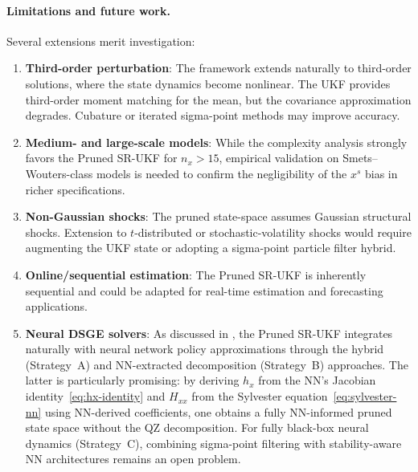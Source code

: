 \documentclass[12pt,a4paper]{article}
\newcommand{\xs}{{x^{s}}}
\newcommand{\hx}{h_x}
\newcommand{\Hxx}{H_{xx}}
\begin{document}
\paragraph{Limitations and future work.}
Several extensions merit investigation:
\begin{enumerate}[nosep]
\item \textbf{Third-order perturbation}: The framework extends
naturally to third-order solutions, where the state dynamics become
nonlinear. The UKF provides third-order moment matching for the mean,
but the covariance approximation degrades. Cubature or iterated
sigma-point methods may improve accuracy.
\item \textbf{Medium- and large-scale models}: While the complexity
analysis strongly favors the Pruned SR-UKF for $n_x > 15$, empirical
validation on Smets--Wouters-class models is needed to confirm the
negligibility of the $\xs$ bias in richer specifications.
\item \textbf{Non-Gaussian shocks}: The pruned state-space assumes
Gaussian structural shocks. Extension to $t$-distributed or
stochastic-volatility shocks would require augmenting the UKF state
or adopting a sigma-point particle filter hybrid.
\item \textbf{Online/sequential estimation}: The Pruned SR-UKF is
inherently sequential and could be adapted for real-time estimation
and forecasting applications.
\item \textbf{Neural DSGE solvers}: As discussed in
, the Pruned SR-UKF integrates naturally with
neural network policy approximations through the hybrid
(Strategy~A) and NN-extracted decomposition (Strategy~B) approaches.
The latter is particularly promising: by deriving $\hx$ from the
NN's Jacobian identity~\eqref{eq:hx-identity} and $\Hxx$ from the
Sylvester equation~\eqref{eq:sylvester-nn} using NN-derived
coefficients, one obtains a fully NN-informed pruned state space
without the QZ decomposition. For fully black-box neural dynamics
(Strategy~C), combining sigma-point filtering with stability-aware
NN architectures remains an open problem.
\end{enumerate}


\newpage

\end{document}

